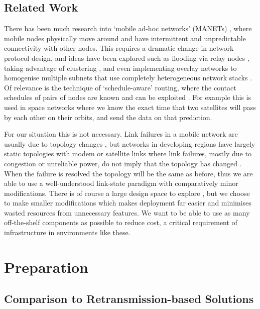 \documentclass[withindex,glossary,openany]{cam-thesis}
\begin{document}
\section{Related Work}

There has been much research into `mobile ad-hoc networks' (MANETs) \cite{ABOLHASAN2004}, where mobile nodes physically move around and have intermittent and unpredictable connectivity with other nodes. This requires a dramatic change in network protocol design, and ideas have been explored such as flooding via relay nodes \cite{CLAUSEN2003}, taking advantage of clustering \cite{ONUR2022}, and even implementing overlay networks to homogenise multiple subnets that use completely heterogeneous network stacks \cite{SCOTT2007}. Of relevance is the technique of `schedule-aware' routing, where the contact schedules of pairs of nodes are known and can be exploited \cite{GARETTO2009}. For example this is used in space networks where we know the exact time that two satellites will pass by each other on their orbits, and send the data on that prediction.

For our situation this is not necessary. Link failures in a mobile network are usually due to topology changes \cite{DIVECHA2007}, but networks in developing regions have largely static topologies with modem or satellite links where link failures, mostly due to congestion or unreliable power, do not imply that the topology has changed \cite{DEMMER2007}. When the failure is resolved the topology will be the same as before, thus we are able to use a well-understood link-state paradigm with comparatively minor modifications. There is of course a large design space to explore \cite{FARRELL2006}, but we choose to make smaller modifications which makes deployment far easier and minimises wasted resources from unnecessary features. We want to be able to use as many off-the-shelf components as possible to reduce cost, a critical requirement of infrastructure in environments like these.


\chapter{Preparation}

\section{Comparison to Retransmission-based Solutions}
\label{sec:retransmission}
\end{document}
